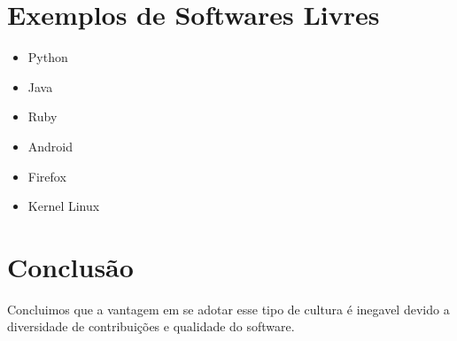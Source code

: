 \documentclass[12pt, onecolumn]{article}
\begin{document}
    \section{Exemplos de Softwares Livres}
        \begin{itemize}
            \item Python
            \item Java
            \item Ruby
            \item Android
            \item Firefox
            \item Kernel Linux
        \end{itemize}
        
    \section{Conclusão}
        \hspace{2cm} Concluimos que a vantagem em se adotar esse tipo de cultura é inegavel devido a diversidade de contribuições 
        e qualidade do software.
\end{document}
